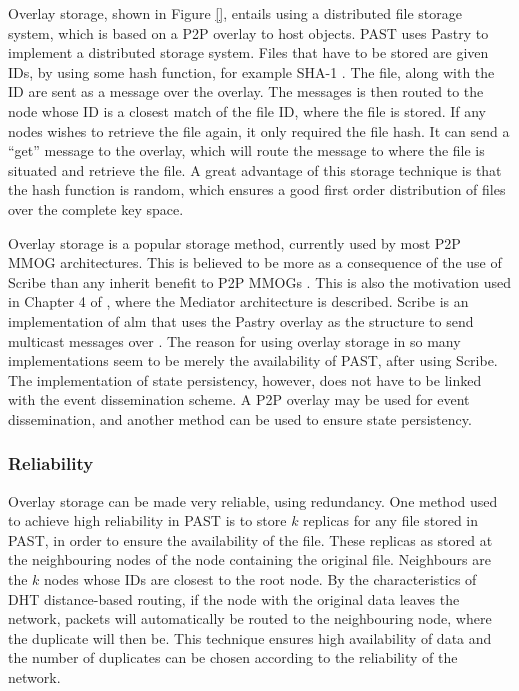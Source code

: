 \documentclass[10pt,a4paper,journal,cspaper,compsoc]{IEEEtran}
\begin{document}
Overlay storage, shown in Figure \ref{}, entails using a distributed file storage system, which is based on a P2P overlay to host objects. PAST
\cite{PAST_storage} uses Pastry to implement a distributed storage system. Files that have to be stored are given IDs, by using some hash function,
for example SHA-1 \cite{SHA}. The file, along with the ID are sent as a message over the overlay. The messages is then routed to the node whose ID is
a closest match of the file ID, where the file is stored. If any nodes wishes to retrieve the file again, it only required the file hash. It can send
a ``get'' message to the overlay, which will route the message to where the file is situated and retrieve the file. A great advantage of this storage
technique is that the hash function is random, which ensures a good first order distribution of files over the complete key space.


Overlay storage is a popular storage method, currently used by most P2P MMOG architectures. This is believed to be more as a consequence of the use
of Scribe than any inherit benefit to P2P MMOGs \cite{past_storage_focus}. This is also the motivation used in Chapter 4 of \cite{Fan_phd}, where the
Mediator architecture is described. Scribe is an implementation of \ac{alm} that uses the Pastry overlay as the structure to send multicast messages
over \cite{scribe}. The reason for using overlay storage in so many implementations seem to be merely the availability of PAST, after using Scribe.
The implementation of state persistency, however, does not have to be linked with the event dissemination scheme. A P2P overlay may be used for event
dissemination, and another method can be used to ensure state persistency.

\subsubsection{Reliability}
\label{overlay_storage_reliability}

Overlay storage can be made very reliable, using redundancy. One method used to achieve high reliability in PAST is to store $k$ replicas for any
file stored in PAST, in order to ensure the availability of the file. These replicas as stored at the neighbouring nodes of the node containing the
original file. Neighbours are the $k$ nodes whose IDs are closest to the root node. By the characteristics of DHT distance-based routing, if the node
with the original data leaves the network, packets will automatically be routed to the neighbouring node, where the duplicate will then be. This
technique ensures high availability of data and the number of duplicates can be chosen according to the reliability of the network.
\end{document}

